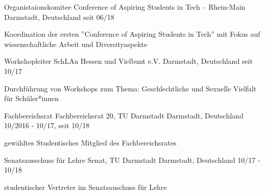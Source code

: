 

\begin{cventries}

  \cventry
    {Organistaionskomitee} %
    {Conference of Aspiring Students in Tech -- Rhein-Main} %
    {Darmstadt, Deutschland} %
    {seit 06/18} %
    {
      \begin{cvitems} %
        \item {Koordination der ersten ''Conference of Aspiring Students in Tech'' mit Fokus auf wissenschaftliche Arbeit und Diversityaspekte}
      \end{cvitems}
    }

  \cventry
    {Workshopleiter} %
    {SchLAu Hessen und Vielbunt e.V.} %
    {Darmstadt, Deutschland} %
    {seit 10/17} %
    {
      \begin{cvitems} %
        \item {Durchführung von Workshops zum Thema: Geschlechtliche und Sexuelle Vielfalt für Schüler*innen}
      \end{cvitems}
    }

  \cventry
    {Fachbereichsrat} %
    {Fachbereichsrat 20, TU Darmstadt} %
    {Darmstadt, Deutschland} %
    {10/2016 - 10/17, seit 10/18} %
    {
      \begin{cvitems} %
        \item {gewähltes Studentisches Mitglied des Fachbereichsrates}
      \end{cvitems}
    }

  \cventry
    {Senatsausschuss für Lehre} %
    {Senat, TU Darmstadt} %
    {Darmstadt, Deutschland} %
    {10/17 - 10/18} %
    {
      \begin{cvitems} %
        \item {studentischer Vertreter im Senatsauschuss für Lehre}
      \end{cvitems}
    }


\end{cventries}
